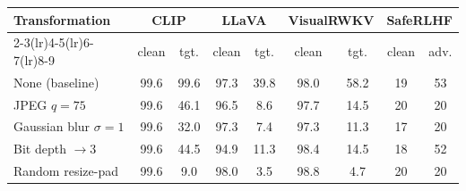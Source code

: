 \begin{tabular}{@{}l cc cc cc cc@{}}
\toprule
\multirow{2}{*}{Transformation} & \multicolumn{2}{c}{CLIP} & \multicolumn{2}{c}{LLaVA} & \multicolumn{2}{c}{VisualRWKV} & \multicolumn{2}{c}{SafeRLHF} \\
\cmidrule(lr){2-3}\cmidrule(lr){4-5}\cmidrule(lr){6-7}\cmidrule(lr){8-9}
  & clean & tgt. & clean & tgt. & clean & tgt. & clean & adv. \\
\midrule
None (baseline) & 99.6 & 99.6 & 97.3 & 39.8 & 98.0 & 58.2 & 19 & 53 \\
JPEG $q{=}75$ & 99.6 & 46.1 & 96.5 & 8.6 & 97.7 & 14.5 & 20 & 20 \\
Gaussian blur $\sigma{=}1$ & 99.6 & 32.0 & 97.3 & 7.4 & 97.3 & 11.3 & 17 & 20 \\
Bit depth $\to 3$ & 99.6 & 44.5 & 94.9 & 11.3 & 98.4 & 14.5 & 18 & 52 \\
Random resize-pad & 99.6 & 9.0 & 98.0 & 3.5 & 98.8 & 4.7 & 20 & 20 \\
\bottomrule
\end{tabular}
